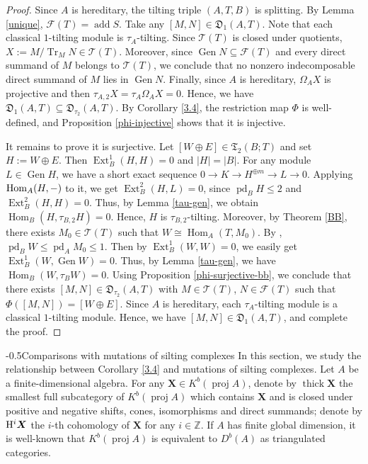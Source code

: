 \documentclass[reqno,12pt]{amsart}
\makeatletter
\numberwithin{equation}{section}
\theoremstyle{plain}
\theoremstyle{definition}
\renewcommand{\section}{\@startsection{section}{1}{0mm}
  {-\baselineskip}{0.5\baselineskip}{\bf\leftline}}
\makeatother
\begin{document}
\begin{proof}
Since $A$ is hereditary, the tilting triple $(A,T,B)$ is splitting.
By Lemma \ref{unique}, $\mathcal F(T)=\operatorname{add}S$. Take any
$[M,N]\in\mathfrak D_1(A,T)$. Note that each classical $1$-tilting module is
$\tau_A$-tilting. Since $\mathcal T(T)$ is closed under quotients,
$X:=M/\operatorname{Tr}_M N\in\mathcal T(T)$. Moreover, since
$\operatorname{Gen}N\subseteq\mathcal F(T)$ and every direct summand
of $M$ belongs to $\mathcal T(T)$, we conclude that no nonzero indecomposable
direct summand of $M$ lies in $\operatorname{Gen}N$. Finally, since
$A$ is hereditary, $\Omega_A X$ is projective and then
$\tau_{A,2}X=\tau_A\Omega_A X=0$. Hence, we have
$\mathfrak D_1(A,T)\subseteq\mathfrak D_{\tau_2}(A,T)$.
By Corollary \ref{3.4}, the  restriction map $\Phi$ is well-defined, and Proposition \ref{phi-injective} shows that it is injective.

It remains to prove it is surjective. Let
$[W\oplus E]\in\mathfrak T_2(B;T)$ and set $H:=W\oplus E$.
Then $\operatorname{Ext}_B^1(H,H)=0$ and $|H|=|B|$.
For any module $L\in\operatorname{Gen}H$, we have a short exact sequence
$0\to K\to H^{\oplus m}\to L\to 0$. Applying $\mbox{\rm Hom}_A(H,-)$ to it, we get $\operatorname{Ext}_B^2(H,L)=0$, since
$\operatorname{pd}_B H\leq2$ and
$\operatorname{Ext}_B^2(H,H)=0$. Thus, by Lemma \ref{tau-gen}, we obtain
$\operatorname{Hom}_B(H,\tau_{B,2}H)=0$. Hence, $H$ is $\tau_{B,2}$-tilting.
Moreover, by Theorem \ref{BB}, there exists $M_0\in\mathcal T(T)$ such that
$W\cong\operatorname{Hom}_A(T,M_0)$. By
\cite[VI, Lemma 4.1]{ASS},
$\operatorname{pd}_B W\leq\operatorname{pd}_A M_0\leq1$. Then by
$\operatorname{Ext}_B^1(W,W)=0$, we easily get
$\operatorname{Ext}_B^1(W,\operatorname{Gen}W)=0$. Thus, by Lemma \ref{tau-gen}, we have
$\operatorname{Hom}_B(W,\tau_BW)=0$. Using Proposition \ref{phi-surjective-bb}, we conclude that there exists
$[M,N]\in\mathfrak D_{\tau_2}(A,T)$ with
$M\in\mathcal T(T)$, $N\in\mathcal F(T)$ such that
$\Phi([M,N])=[W\oplus E]$. Since $A$ is hereditary,
each $\tau_A$-tilting module is a classical
$1$-tilting module. Hence, we have $[M,N]\in\mathfrak D_1(A,T)$, and complete the proof.
\end{proof}


\section{Comparisons with mutations of silting complexes}
In this section, we study the relationship between Corollary \ref{3.4} and mutations of silting complexes. Let $A$ be a finite-dimensional algebra. For any \( \boldsymbol{X} \in K^b(\operatorname{proj} A)\), denote by $\operatorname{thick} \boldsymbol{X}$ the smallest full subcategory of $K^b(\operatorname{proj} A)$ which contains $\boldsymbol{X}$ and is closed under positive and negative shifts, cones, isomorphisms and direct summands; denote by ${\rm H}^i\boldsymbol{X}$ the $i$-th cohomology of $\boldsymbol{X}$ for any $i\in\mathbb{Z}$. If $A$ has finite global dimension, it is well-known that $K^b(\operatorname{proj} A)$ is equivalent to $D^b(A)$ as triangulated categories.
\end{document}
